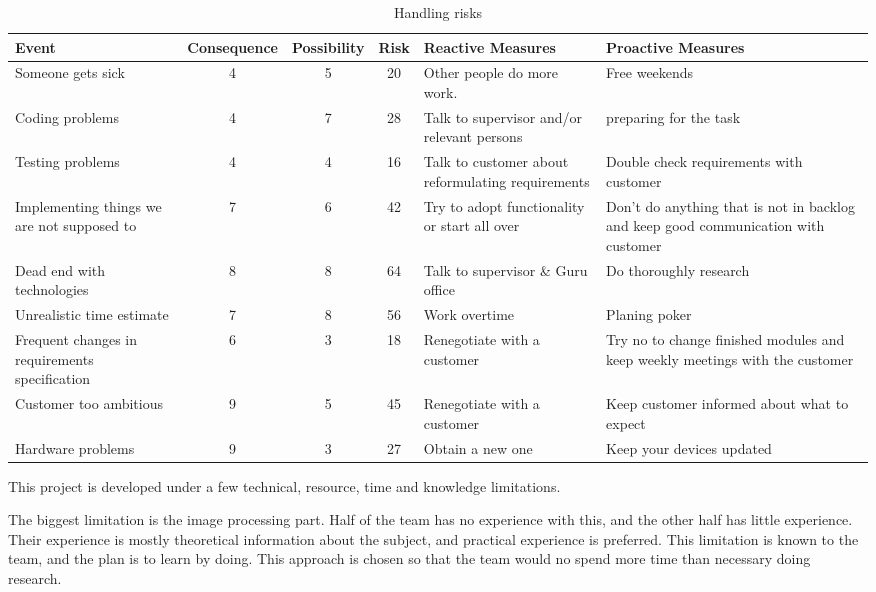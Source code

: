 \begin{table}
    \caption{Handling risks}
    \label{tab:risks}
    
    \centering {}
    \vspace{2mm} %
    \begin{tabularx}{500pt}{XcccXX}
    \toprule[0.5mm]
        Event & Consequence & Possibility & Risk  & Reactive Measures & Proactive Measures \\
    \midrule
Someone gets sick & 4     & 5     & 20    & Other people do more work.  & Free weekends \\
Coding problems & 4     & 7     & 28    & Talk to supervisor and/or relevant persons & preparing for the task \\
Testing problems & 4     & 4     & 16    & Talk to customer about reformulating requirements & Double check requirements with customer \\
Implementing things we are not supposed to & 7     & 6     & 42    & Try to adopt functionality or start all over & Don't do anything that is not in backlog and keep good communication with customer \\
Dead end with technologies & 8     & 8     & 64    & Talk to supervisor \& Guru office & Do thoroughly research \\
Unrealistic time estimate & 7     & 8     & 56    & Work overtime  & Planing poker \\
Frequent changes in requirements specification & 6     & 3     & 18    & Renegotiate with a customer & Try no to change finished modules and keep weekly meetings with the customer \\
Customer too ambitious & 9     & 5     & 45    & Renegotiate with a customer & Keep customer informed about what  to expect \\
Hardware problems & 9     & 3     & 27    & Obtain a new one & Keep your devices updated \\
\bottomrule[0.5mm]
\end{tabularx}
\end{table}

\label{sec:limitations}
This project is developed under a few technical, resource, time and knowledge limitations. 

The biggest limitation is the image processing part. Half of the team has no experience with this, and the other half has little experience. Their experience is mostly theoretical information about the subject, and practical experience is preferred. This limitation is known to the team, and the plan is to learn by doing. This approach is chosen so that the team would no spend more time than necessary doing research.

